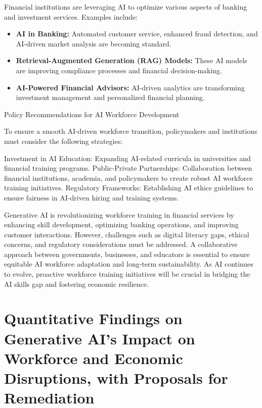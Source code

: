 \documentclass[a4paper,headinclude=on,footinclude=on,12pt,oneside]{scrbook}
\begin{document}

Financial institutions are leveraging AI to optimize various aspects of banking and investment services. Examples include:
\begin{itemize}
	\item \textbf{AI in Banking:} Automated customer service, enhanced fraud detection, and AI-driven market analysis are becoming standard.
	\item \textbf{Retrieval-Augmented Generation (RAG) Models:} These AI models are improving compliance processes and financial decision-making.
	\item \textbf{AI-Powered Financial Advisors:} AI-driven analytics are transforming investment management and personalized financial planning.
\end{itemize}

Policy Recommendations for AI Workforce Development

To ensure a smooth AI-driven workforce transition, policymakers and institutions must consider the following strategies:

Investment in AI Education: Expanding AI-related curricula in universities and financial training programs.
Public-Private Partnerships: Collaboration between financial institutions, academia, and policymakers to create robust AI workforce training initiatives.
Regulatory Frameworks: Establishing AI ethics guidelines to ensure fairness in AI-driven hiring and training systems.



Generative AI is revolutionizing workforce training in financial services by enhancing skill development, optimizing banking operations, and improving customer interactions. However, challenges such as digital literacy gaps, ethical concerns, and regulatory considerations must be addressed. A collaborative approach between governments, businesses, and educators is essential to ensure equitable AI workforce adaptation and long-term sustainability. As AI continues to evolve, proactive workforce training initiatives will be crucial in bridging the AI skills gap and fostering economic resilience.


\chapter{Quantitative Findings on Generative AI’s Impact on Workforce and Economic Disruptions, with Proposals for Remediation}
\end{document}

